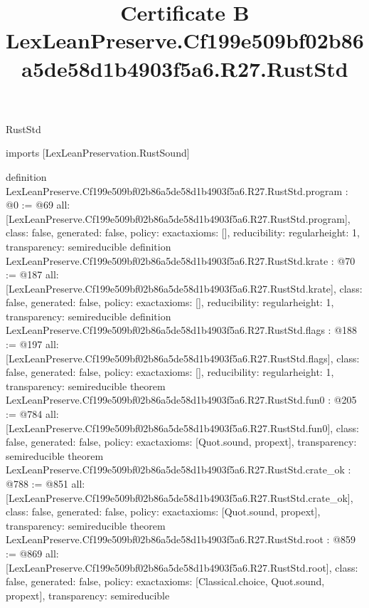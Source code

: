 \begin{lexlean}{RustStd}
\title{Certificate B LexLeanPreserve.Cf199e509bf02b86a5de58d1b4903f5a6.R27.RustStd}
\begin{coremodule}
imports [LexLeanPreservation.RustSound]

definition LexLeanPreserve.Cf199e509bf02b86a5de58d1b4903f5a6.R27.RustStd.program : @0 := @69 {
  all: [LexLeanPreserve.Cf199e509bf02b86a5de58d1b4903f5a6.R27.RustStd.program],
  class: false,
  generated: false,
  policy: exact{axioms: []},
  reducibility: regular{height: 1},
  transparency: semireducible
}
definition LexLeanPreserve.Cf199e509bf02b86a5de58d1b4903f5a6.R27.RustStd.krate : @70 := @187 {
  all: [LexLeanPreserve.Cf199e509bf02b86a5de58d1b4903f5a6.R27.RustStd.krate],
  class: false,
  generated: false,
  policy: exact{axioms: []},
  reducibility: regular{height: 1},
  transparency: semireducible
}
definition LexLeanPreserve.Cf199e509bf02b86a5de58d1b4903f5a6.R27.RustStd.flags : @188 := @197 {
  all: [LexLeanPreserve.Cf199e509bf02b86a5de58d1b4903f5a6.R27.RustStd.flags],
  class: false,
  generated: false,
  policy: exact{axioms: []},
  reducibility: regular{height: 1},
  transparency: semireducible
}
theorem LexLeanPreserve.Cf199e509bf02b86a5de58d1b4903f5a6.R27.RustStd.fun0 : @205 := @784 {
  all: [LexLeanPreserve.Cf199e509bf02b86a5de58d1b4903f5a6.R27.RustStd.fun0],
  class: false,
  generated: false,
  policy: exact{axioms: [Quot.sound, propext]},
  transparency: semireducible
}
theorem LexLeanPreserve.Cf199e509bf02b86a5de58d1b4903f5a6.R27.RustStd.crate_ok : @788 := @851 {
  all: [LexLeanPreserve.Cf199e509bf02b86a5de58d1b4903f5a6.R27.RustStd.crate_ok],
  class: false,
  generated: false,
  policy: exact{axioms: [Quot.sound, propext]},
  transparency: semireducible
}
theorem LexLeanPreserve.Cf199e509bf02b86a5de58d1b4903f5a6.R27.RustStd.root : @859 := @869 {
  all: [LexLeanPreserve.Cf199e509bf02b86a5de58d1b4903f5a6.R27.RustStd.root],
  class: false,
  generated: false,
  policy: exact{axioms: [Classical.choice, Quot.sound, propext]},
  transparency: semireducible
}


\end{coremodule}
\end{lexlean}
